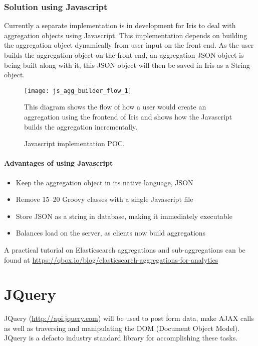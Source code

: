 \documentclass[12pt,a4paper,titlepage]{report}
\begin{document}
\subsubsection{Solution using Javascript}

Currently a separate implementation is in development for Iris to deal with aggregation objects using Javascript. This implementation depends on building the aggregation object dynamically from user input on the front end. As the user builds the aggregation object on the front end, an aggregation JSON object is being built along with it, this JSON object will then be saved in Iris as a String object.
\begin{figure}[H]
\begin{tcolorbox}
\centerline{\texttt{[image: js\_agg\_builder\_flow\_1]}}

This diagram shows the flow of how a user would create an aggregation using the frontend of Iris and shows how the Javascript builds the aggregation incrementally.
\end{tcolorbox}
\caption{Javascript implementation POC.}
\end{figure}

\paragraph{Advantages of using Javascript}

\begin{itemize}
\item Keep the aggregation object in its native language, JSON
\item Remove 15--20 Groovy classes with a single Javascript file
\item Store JSON as a string in database, making it immediately executable
\item Balances load on the server, as clients now build aggregations
\end{itemize}
A practical tutorial on Elasticsearch aggregations and sub-aggregations can be found at  \url{https://qbox.io/blog/elasticsearch-aggregations-for-analytics}

\section{JQuery}

JQuery (\url{http://api.jquery.com}) will be used to post form data, make AJAX calls as well as traversing and manipulating the DOM (Document Object Model). JQuery is a defacto industry standard library for accomplishing these tasks.
\end{document}
